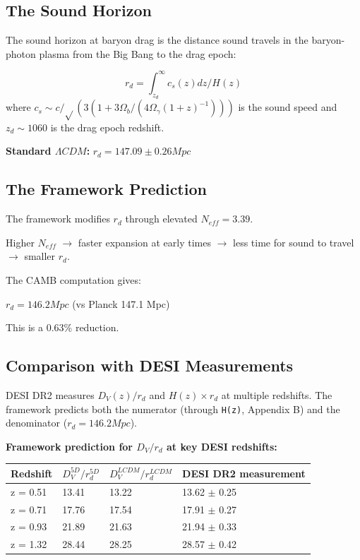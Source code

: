 \documentclass[aps,prd,preprint,superscriptaddress,longbibliography]{revtex4-2}
\begin{document}
\subsection{The Sound Horizon}

The sound horizon at baryon drag is the distance sound travels in the baryon-photon plasma from the Big Bang to the drag epoch:


\begin{equation}
    r_d = \int_{z_d}^\infty c_s(z) dz / H(z)
\end{equation}
where $c_s \sim  c/\sqrt{}(3(1 + 3\Omega_b/(4\Omega_\gamma(1+z)^{-1})))$ is the sound speed and $z_d \sim  1060$ is the drag epoch redshift.

\textbf{Standard $\Lambda CDM$:} $r_d = 147.09 \pm 0.26 Mpc$ \cite{Planck2018_VI}



\subsection{The Framework Prediction}

The framework modifies $r_d$ through elevated $N_{eff} = 3.39$.

Higher $N_{eff}$ $\to$ faster expansion at early times $\to$ less time for sound to travel $\to$ smaller $r_d$.

The CAMB computation gives:

\textbf{$r_d = 146.2 Mpc$} (vs Planck 147.1 Mpc)

This is a 0.63\% reduction.



\subsection{Comparison with DESI Measurements}

DESI DR2 measures $D_V(z)/r_d$ and $H(z) \times r_d$ at multiple redshifts. The framework predicts both the numerator (through \texttt{H(z)}, Appendix B) and the denominator ($r_d = 146.2 Mpc$).

\textbf{Framework prediction for $D_V/r_d$ at key DESI redshifts:}


\begin{table}[H]
\begin{ruledtabular}
\begin{tabular}{p{3.8cm}p{3.8cm}p{3.8cm}p{3.8cm}}
Redshift & $D_V^{5D}/r_d^{5D}$ & $D_V^{LCDM}/r_d^{LCDM}$ & DESI DR2 measurement \\
\hline
z = 0.51 & 13.41 & 13.22 & 13.62 $\pm$ 0.25 \\
z = 0.71 & 17.76 & 17.54 & 17.91 $\pm$ 0.27 \\
z = 0.93 & 21.89 & 21.63 & 21.94 $\pm$ 0.33 \\
z = 1.32 & 28.44 & 28.25 & 28.57 $\pm$ 0.42 \\
\end{tabular}
\end{ruledtabular}
\end{table}
\end{document}
